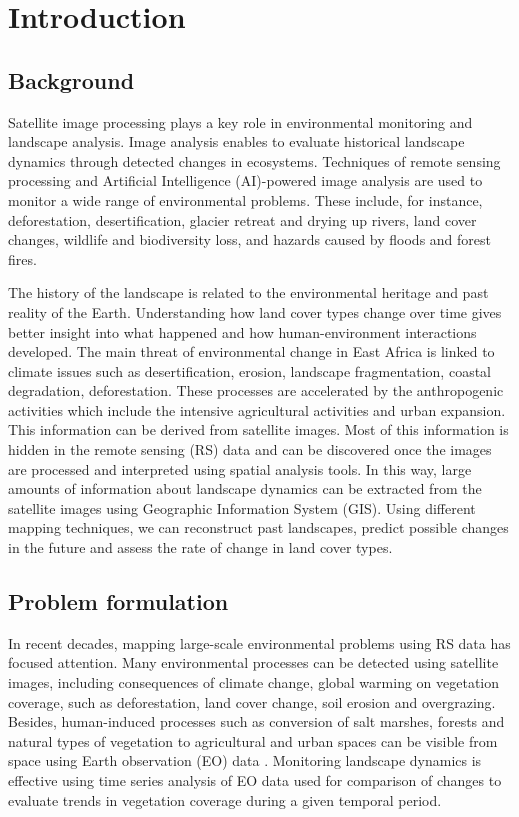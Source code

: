 \documentclass[jimaging,article,submit,pdftex,moreauthors]{Definitions/mdpi}
\begin{document}
\section{Introduction}

\subsection{Background}

Satellite image processing plays a key role in environmental monitoring and landscape analysis. Image analysis enables to evaluate historical landscape dynamics through detected changes in ecosystems. Techniques of remote sensing processing and Artificial Intelligence (AI)-powered image analysis are used to monitor a wide range of environmental problems. These include, for instance, deforestation, desertification, glacier retreat and drying up rivers, land cover changes, wildlife and biodiversity loss, and hazards caused by floods and forest fires.

The history of the landscape is related to the environmental heritage and past reality of the Earth. Understanding how land cover types change over time gives better insight into what happened and how human-environment interactions developed. The main threat of environmental change in East Africa is linked to climate issues such as desertification, erosion, landscape fragmentation, coastal degradation, deforestation. These processes are accelerated by the anthropogenic activities which include the intensive agricultural activities and urban expansion. This information can be derived from satellite images. Most of this information is hidden in the remote sensing (RS) data and can be discovered once the images are processed and interpreted using spatial analysis tools. In this way, large amounts of information about landscape dynamics can be extracted from the satellite images using Geographic Information System (GIS). Using different mapping techniques, we can reconstruct past landscapes, predict possible changes in the future and assess the rate of change in land cover types.

\subsection{Problem formulation}

In recent decades, mapping large-scale environmental problems using RS data has focused attention. Many environmental processes can be detected using satellite images, including consequences of climate change, global warming on vegetation coverage, such as deforestation, land cover change, soil erosion and overgrazing. Besides, human-induced processes such as conversion of salt marshes, forests and natural types of vegetation to agricultural and urban spaces can be visible from space using Earth observation (EO) data \cite{Ndehedehe2022,Foli,Speranza}. Monitoring landscape dynamics is effective using time series analysis of EO data used for comparison of changes to evaluate trends in vegetation coverage during a given temporal period.
\end{document}
